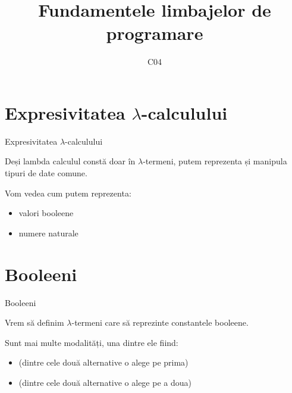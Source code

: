 \documentclass[xcolor=pdftex,romanian,colorlinks]{beamer}
\title[FLP]{Fundamentele limbajelor de programare}
\subtitle{C04}
\date{}
\begin{document}
\begin{frame}
  \titlepage
\end{frame}

\setlength{\leftmargini}{12pt}


\section{\color{section-color} Expresivitatea $\lambda$-calculului}

\begin{frame}{Expresivitatea $\lambda$-calculului}

Deși lambda calculul constă doar în $\lambda$-termeni, putem reprezenta și manipula tipuri de date comune.

Vom vedea cum putem reprezenta:
\begin{itemize}
	\item valori booleene
	\item numere naturale
\end{itemize}
\end{frame}

\section{\color{section-color} \large Booleeni}

\begin{frame}{Booleeni}

Vrem să definim $\lambda$-termeni care să reprezinte constantele booleene.

Sunt mai multe modalități, una dintre ele fiind:

\begin{itemize}
	\item {}  \hfill (dintre cele două alternative o alege pe prima)
	\item {} \hfill (dintre cele două alternative o alege pe a doua)
\end{itemize}

\end{frame}
\end{document}
